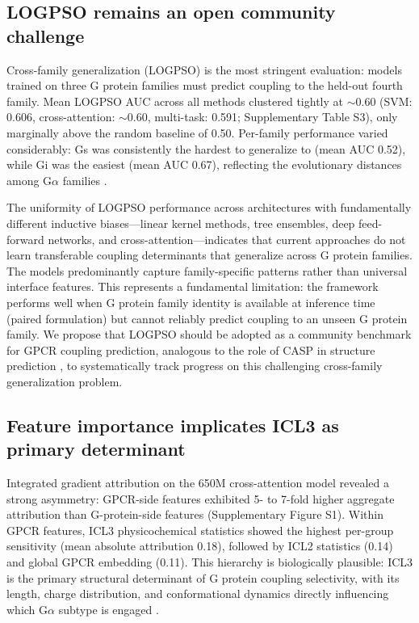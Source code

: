 \documentclass[11pt,a4paper]{article}
\begin{document}
\subsection{LOGPSO remains an open community challenge}

Cross-family generalization (LOGPSO) is the most stringent evaluation: models trained on three G protein families must predict coupling to the held-out fourth family. Mean LOGPSO AUC across all methods clustered tightly at $\sim$0.60 (SVM: 0.606, cross-attention: $\sim$0.60, multi-task: 0.591; Supplementary Table S3), only marginally above the random baseline of 0.50. Per-family performance varied considerably: Gs was consistently the hardest to generalize to (mean AUC 0.52), while Gi was the easiest (mean AUC 0.67), reflecting the evolutionary distances among G$\alpha$ families \cite{wettschureck2005mammalian}.

The uniformity of LOGPSO performance across architectures with fundamentally different inductive biases---linear kernel methods, tree ensembles, deep feed-forward networks, and cross-attention---indicates that current approaches do not learn transferable coupling determinants that generalize across G protein families. The models predominantly capture family-specific patterns rather than universal interface features. This represents a fundamental limitation: the framework performs well when G protein family identity is available at inference time (paired formulation) but cannot reliably predict coupling to an unseen G protein family. We propose that LOGPSO should be adopted as a community benchmark for GPCR coupling prediction, analogous to the role of CASP in structure prediction \cite{kryshtafovych2023casp15}, to systematically track progress on this challenging cross-family generalization problem.

\subsection{Feature importance implicates ICL3 as primary determinant}

Integrated gradient attribution on the 650M cross-attention model revealed a strong asymmetry: GPCR-side features exhibited 5- to 7-fold higher aggregate attribution than G-protein-side features (Supplementary Figure S1). Within GPCR features, ICL3 physicochemical statistics showed the highest per-group sensitivity (mean absolute attribution 0.18), followed by ICL2 statistics (0.14) and global GPCR embedding (0.11). This hierarchy is biologically plausible: ICL3 is the primary structural determinant of G protein coupling selectivity, with its length, charge distribution, and conformational dynamics directly influencing which G$\alpha$ subtype is engaged \cite{flock2023selectivity, rasmussen2011crystal}.
\end{document}
